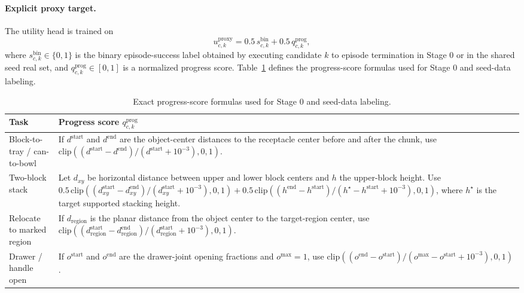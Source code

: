 \documentclass[10pt]{article}
\theoremstyle{plain}
\theoremstyle{definition}
\theoremstyle{remark}
\begin{document}
\paragraph{Explicit proxy target.}

The utility head is trained on
\[
u^{\mathrm{proxy}}_{c,k}=0.5\,s^{\mathrm{bin}}_{c,k}+0.5\,q^{\mathrm{prog}}_{c,k},
\]
where $s^{\mathrm{bin}}_{c,k}\in\{0,1\}$ is the binary episode-success label obtained by executing candidate $k$ to episode termination in Stage 0 or in the shared seed real set, and $q^{\mathrm{prog}}_{c,k}\in[0,1]$ is a normalized progress score. Table~\ref{tab:progress} defines the progress-score formulas used for Stage 0 and seed-data labeling.

\begin{table}[H]
\centering
\small
\caption{Exact progress-score formulas used for Stage 0 and seed-data labeling.\label{tab:progress}}
\begin{tabularx}{\linewidth}{@{}p{3.0cm}X@{}}
\toprule
Task & Progress score $q^{\mathrm{prog}}_{c,k}$ \\
\midrule
Block-to-tray / can-to-bowl & If $d^{\mathrm{start}}$ and $d^{\mathrm{end}}$ are the object-center distances to the receptacle center before and after the chunk, use $\mathrm{clip}((d^{\mathrm{start}}-d^{\mathrm{end}})/(d^{\mathrm{start}}+10^{-3}),0,1)$. \\
Two-block stack & Let $d_{xy}$ be horizontal distance between upper and lower block centers and $h$ the upper-block height. Use $0.5\,\mathrm{clip}((d_{xy}^{\mathrm{start}}-d_{xy}^{\mathrm{end}})/(d_{xy}^{\mathrm{start}}+10^{-3}),0,1)+0.5\,\mathrm{clip}((h^{\mathrm{end}}-h^{\mathrm{start}})/(h^{\star}-h^{\mathrm{start}}+10^{-3}),0,1)$, where $h^{\star}$ is the target supported stacking height. \\
Relocate to marked region & If $d_{\mathrm{region}}$ is the planar distance from the object center to the target-region center, use $\mathrm{clip}((d_{\mathrm{region}}^{\mathrm{start}}-d_{\mathrm{region}}^{\mathrm{end}})/(d_{\mathrm{region}}^{\mathrm{start}}+10^{-3}),0,1)$. \\
Drawer / handle open & If $o^{\mathrm{start}}$ and $o^{\mathrm{end}}$ are the drawer-joint opening fractions and $o^{\max}=1$, use $\mathrm{clip}((o^{\mathrm{end}}-o^{\mathrm{start}})/(o^{\max}-o^{\mathrm{start}}+10^{-3}),0,1)$. \\
\bottomrule
\end{tabularx}
\end{table}
\end{document}
